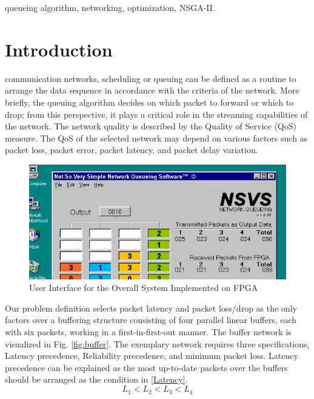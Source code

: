 \documentclass[journal,twoside]{IEEEtran}
\begin{document}
\begin{IEEEkeywords}
queueing algorithm, networking, optimization, NSGA-II.
\end{IEEEkeywords}


\section{Introduction}
 communication networks, scheduling or queuing can be defined as a routine to arrange the data sequence in accordance with the criteria of the network. More briefly, the queuing algorithm decides on which packet to forward or which to drop; from this perspective, it plays a critical role in the streaming capabilities of the network. The network quality is described by the Quality of Service (QoS) measure. The QoS of the selected network may depend on various factors such as packet loss, packet error, packet latency, and packet delay variation. \\

\begin{figure}[ht]
    \centering
    \includegraphics[width=0.95\linewidth]{figures/fig_vga_4.png}
    \captionsetup{justification=centering}
    \caption{User Interface for the Overall System Implemented on FPGA}
    \label{fig:VGA}
\end{figure}


\indent Our problem definition selects packet latency and packet loss/drop as the only factors over a buffering structure consisting of four parallel linear buffers, each with six packets, working in a first-in-first-out manner. The buffer network is visualized in Fig. \ref{fig:buffer}. The exemplary network requires three specifications, Latency precedence, Reliability precedence, and minimum packet loss. Latency precedence can be explained as the most up-to-date packets over the buffers should be arranged as the condition in \ref{Latency}.
\begin{equation}\label{Latency}
L_{1} < L_{2} < L_{3} < L_{4}
\end{equation}
\end{document}
